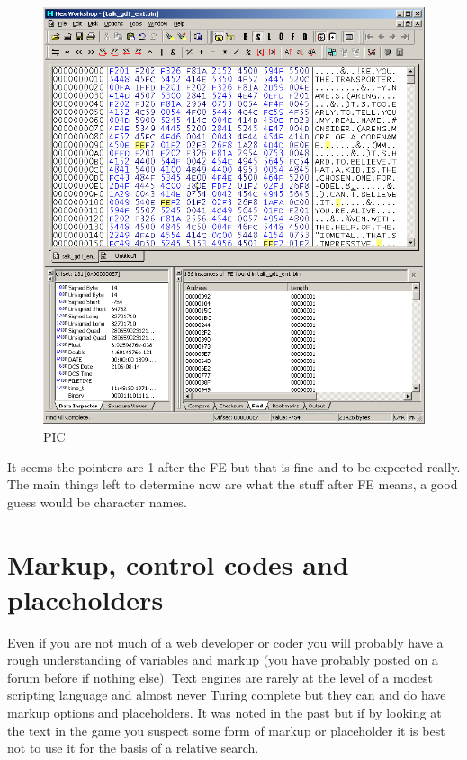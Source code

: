 \documentclass[
]{book}
\begin{document}
\begin{figure}
\centering
\includegraphics{images/105_home_fast6191_romhackingguide_unrenamed_fil___borders_romhackingguidepointersexamplehexw4.png}
\caption{PIC}
\end{figure}

It seems the pointers are 1 after the FE but that is fine and to be expected really. The main things left to determine now are what the stuff after FE means, a good guess would be character names.

\hypertarget{markup-control-codes-and-placeholders}{%
\section{Markup, control codes and placeholders}\label{markup-control-codes-and-placeholders}}

Even if you are not much of a web developer or coder you will probably have a rough understanding of variables and markup (you have probably posted on a forum before if nothing else). Text engines are rarely at the level of a modest scripting language and almost never Turing complete but they can and do have markup options and placeholders. It was noted in the past but if by looking at the text in the game you suspect some form of markup or placeholder it is best not to use it for the basis of a relative search.
\end{document}
